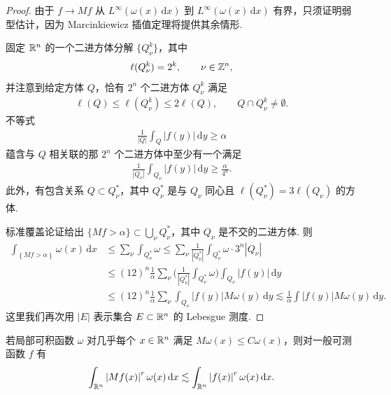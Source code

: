 \begin{proof}
由于 $f \to Mf$ 从 $L^\infty(\omega(x)\,\mathrm{d}x)$ 到 $L^\infty(\omega(x)\,\mathrm{d}x)$ 有界，只须证明弱型估计，因为 Marcinkiewicz 插值定理将提供其余情形.

固定 $\mathbb{R}^n$ 的一个二进方体分解 $\{Q_\nu^k\}$，其中
\begin{align*}
  \ell(Q_{\nu}^{k})=2^{k},\qquad \nu\in\mathbb{Z}^{n},
\end{align*}
并注意到给定方体 $Q$，恰有 $2^n$ 个二进方体 $Q_\nu^k$ 满足
\begin{align*}
  \ell(Q)\leq\ell(Q_{\nu}^{k})\leq 2\ell(Q),\qquad Q\cap Q_{\nu}^{k}\neq\emptyset.
\end{align*}
不等式
\begin{align*}
  \frac{1}{\left|Q\right|}\int_{Q}\left|f(y)\right|\,\mathrm{d}y\geq\alpha
\end{align*}
蕴含与 $Q$ 相关联的那 $2^{n}$ 个二进方体中至少有一个满足
\begin{align*}
  \frac{1}{\left|Q_{\nu}\right|}\int_{Q_{\nu}}\left|f(y)\right|\,\mathrm{d}y\geq\frac{\alpha}{4^{n}}.
\end{align*}
此外，有包含关系 $Q \subset Q_\nu^*$，其中 $Q_\nu^*$ 是与 $Q_\nu$ 同心且 $\ell(Q_\nu^*) = 3\ell(Q_\nu)$ 的方体.

标准覆盖论证给出 $\{Mf > \alpha\} \subset \bigcup_\nu Q_\nu^*$，其中 $Q_\nu$ 是不交的二进方体. 则
\begin{align*}
  \int_{\left\{M f>\alpha\right\}}\omega(x)\,\mathrm{d}x
  &\leq\sum_{\nu}\int_{Q_{\nu}^{*}}\omega
  \leq\sum_{\nu}\frac{1}{\left|Q_{\nu}^{*}\right|}\int_{Q_{\nu}^{*}}\omega\cdot 3^{n}|Q_{\nu}|\\
  &\leq(12)^{n}\frac{1}{\alpha}\sum_{\nu}\Big(\frac{1}{\left|Q_{\nu}^{*}\right|}\int_{Q_{\nu}^{*}}\omega\Big)\int_{Q_{\nu}}\left|f(y)\right|\,\mathrm{d}y\\
  &\leq(12)^{n}\frac{1}{\alpha}\sum_{\nu}\int_{Q_{\nu}}\left|f(y)\right|M\omega(y)\,\mathrm{d}y
  \lesssim\frac{1}{\alpha}\int\left|f(y)\right|M\omega(y)\,\mathrm{d}y.
\end{align*}
这里我们再次用 $|E|$ 表示集合 $E \subset \mathbb{R}^n$ 的 Lebesgue 测度.
\end{proof}

\begin{corollary}\label{cor:4.10}
若局部可积函数 $\omega$ 对几乎每个 $x \in \mathbb{R}^n$ 满足 $M\omega(x) \leq C\omega(x)$，则对一般可测函数 $f$ 有
\begin{align*}
  \int_{\mathbb{R}^{n}}\left|M f(x)\right|^{r}\omega(x)\,\mathrm{d}x\lesssim\int_{\mathbb{R}^{n}}\left|f(x)\right|^{r}\omega(x)\,\mathrm{d}x.
\end{align*}
\end{corollary}

